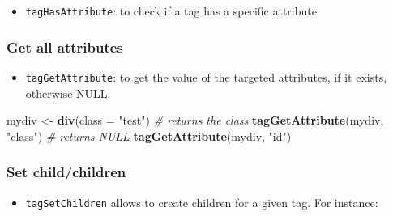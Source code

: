 \documentclass[]{book}
\newenvironment{Shaded}{\begin{snugshade}}{\end{snugshade}}
\newcommand{\CommentTok}[1]{\textcolor[rgb]{0.56,0.35,0.01}{\textit{#1}}}
\newcommand{\DataTypeTok}[1]{\textcolor[rgb]{0.13,0.29,0.53}{#1}}
\newcommand{\KeywordTok}[1]{\textcolor[rgb]{0.13,0.29,0.53}{\textbf{#1}}}
\newcommand{\NormalTok}[1]{#1}
\newcommand{\OperatorTok}[1]{\textcolor[rgb]{0.81,0.36,0.00}{\textbf{#1}}}
\newcommand{\StringTok}[1]{\textcolor[rgb]{0.31,0.60,0.02}{#1}}
\providecommand{\tightlist}{%
  \setlength{\itemsep}{0pt}\setlength{\parskip}{0pt}}
\begin{document}
\begin{itemize}
\tightlist
\item
  \texttt{tagHasAttribute}: to check if a tag has a specific attribute
\end{itemize}

\begin{Shaded}
\end{Shaded}

\hypertarget{get-all-attributes}{%
\subsubsection{Get all attributes}\label{get-all-attributes}}

\begin{itemize}
\tightlist
\item
  \texttt{tagGetAttribute}: to get the value of the targeted attributes, if it exists, otherwise NULL.
\end{itemize}

\begin{Shaded}
\begin{Highlighting}[]
\NormalTok{mydiv <-}\StringTok{ }\KeywordTok{div}\NormalTok{(}\DataTypeTok{class =} \StringTok{"test"}\NormalTok{)}
\CommentTok{# returns the class}
\KeywordTok{tagGetAttribute}\NormalTok{(mydiv, }\StringTok{"class"}\NormalTok{)}
\CommentTok{# returns NULL}
\KeywordTok{tagGetAttribute}\NormalTok{(mydiv, }\StringTok{"id"}\NormalTok{)}
\end{Highlighting}
\end{Shaded}

\hypertarget{set-childchildren}{%
\subsubsection{Set child/children}\label{set-childchildren}}

\begin{itemize}
\tightlist
\item
  \texttt{tagSetChildren} allows to create children for a given tag. For instance:
\end{itemize}
\end{document}
